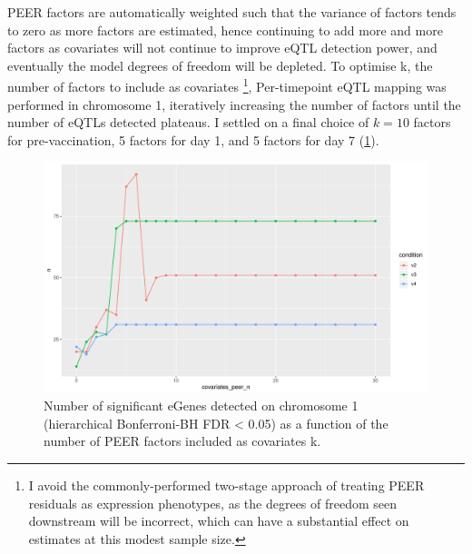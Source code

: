 PEER factors are automatically weighted such that the variance of factors tends to zero as more factors are estimated, 
hence continuing to add more and more factors as covariates will not continue to improve \gls{eQTL} detection power, and eventually the model degrees of freedom will be depleted.
To optimise k, the number of factors to include as covariates%
\footnote{I avoid the commonly-performed two-stage approach of treating PEER residuals as expression phenotypes, as the degrees of freedom seen downstream will be incorrect, which can have a substantial effect on estimates at this modest sample size.}, 
Per-timepoint \gls{eQTL} mapping was performed in chromosome 1, iteratively increasing the number of factors until the number of \glspl{eQTL} detected plateaus.
I settled on a final choice of $k=10$ factors for pre-vaccination, 5 factors for day 1, and 5 factors for day 7 (\cref{fig:hird_neGenesvsPeerK}).

\begin{figure}
    \centering
    \includegraphics[width=1.0\textwidth,page=1]{mainmatter/figures/chapter_03/count_eGenes.signif_eGenes_vs_PEER_n.dataset_mega.chr_chr1.pdf}
    \caption{Number of significant eGenes detected on chromosome 1 (hierarchical Bonferroni-\gls{BH}\autocite{huang2018PowerFalseDiscovery} FDR < 0.05) as a function of the number of PEER factors included as covariates k.}
    \label{fig:hird_neGenesvsPeerK}
\end{figure}

